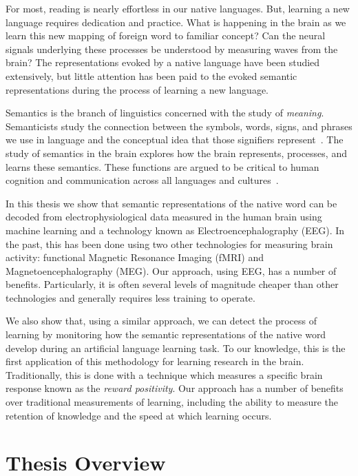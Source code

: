 \label{chapter:introduction}

For most, reading is nearly effortless in our native languages. But, learning a 
new language requires dedication and practice. What is happening in the brain 
as we learn this new mapping of foreign word to familiar concept? Can the 
neural signals underlying these processes be understood by measuring waves from 
the brain? The representations evoked by a native language have been studied 
extensively, but little attention has been paid to the evoked semantic 
representations during the process of learning a new language.
 
Semantics is the branch of linguistics concerned with the study of 
\emph{meaning}. Semanticists study the connection between the symbols, words, 
signs, and phrases we use in language and the conceptual idea that those 
signifiers represent~\cite{kreidler2002introducing}. The study of semantics in 
the brain explores how the brain represents, processes, and learns these 
semantics. These functions are argued to be critical to human cognition and 
communication across all languages and cultures~\cite{croft2004cognitive}.

In this thesis we show that semantic representations of the native word can be 
decoded from electrophysiological data measured in the human brain using 
machine learning and a technology known as Electroencephalography (EEG). In the 
past, this has been done using two other technologies for measuring brain 
activity: functional Magnetic Resonance Imaging (fMRI) and 
Magnetoencephalography (MEG).  Our approach, using EEG, has a number of 
benefits. Particularly, it is often several levels of magnitude cheaper than 
other technologies and generally requires less training to operate.

We also show that, using a similar approach, we can detect the process of 
learning by monitoring how the semantic representations of the native word 
develop during an artificial language learning task. To our knowledge, this is 
the first application of this methodology for learning research in the brain.  
Traditionally, this is done with a technique which measures a specific brain 
response known as the \emph{reward positivity}. Our approach has a number of 
benefits over traditional measurements of learning, including the ability to 
measure the retention of knowledge and the speed at which learning occurs.

\section{Thesis Overview}

